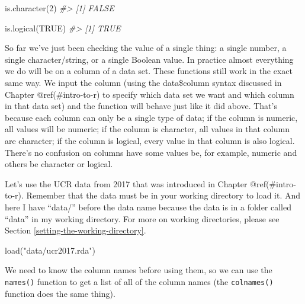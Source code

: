 \documentclass[
]{krantz}
\makeatletter
\newenvironment{Shaded}{\begin{snugshade}}{\end{snugshade}}
\newcommand{\CommentTok}[1]{\textcolor[rgb]{0.37,0.37,0.37}{\textit{#1}}}
\newcommand{\ConstantTok}[1]{\textcolor[rgb]{0,0,0}{#1}}
\newcommand{\DecValTok}[1]{\textcolor[rgb]{0.06,0.06,0.06}{#1}}
\newcommand{\FunctionTok}[1]{\textcolor[rgb]{0,0,0}{#1}}
\newcommand{\NormalTok}[1]{#1}
\newcommand{\StringTok}[1]{\textcolor[rgb]{0.5,0.5,0.5}{#1}}
\newenvironment{kframe}{%
\medskip{}
\setlength{\fboxsep}{.8em}
 \def\at@end@of@kframe{}%
 \ifinner\ifhmode%
  \def\at@end@of@kframe{\end{minipage}}%
  \begin{minipage}{\columnwidth}%
 \fi\fi%
 \def\FrameCommand##1{\hskip\@totalleftmargin \hskip-\fboxsep
 \colorbox{shadecolor}{##1}\hskip-\fboxsep
     \hskip-\linewidth \hskip-\@totalleftmargin \hskip\columnwidth}%
 \MakeFramed {\advance\hsize-\width
   \@totalleftmargin\z@ \linewidth\hsize
   \@setminipage}}%
 {\par\unskip\endMakeFramed%
 \at@end@of@kframe}
\renewenvironment{Shaded}{\begin{kframe}}{\end{kframe}}
\makeatother
\begin{document}
\begin{Shaded}
\begin{Highlighting}[]
\FunctionTok{is.character}\NormalTok{(}\DecValTok{2}\NormalTok{)}
\CommentTok{\#\textgreater{} [1] FALSE}
\end{Highlighting}
\end{Shaded}

\begin{Shaded}
\begin{Highlighting}[]
\FunctionTok{is.logical}\NormalTok{(}\ConstantTok{TRUE}\NormalTok{)}
\CommentTok{\#\textgreater{} [1] TRUE}
\end{Highlighting}
\end{Shaded}

So far we've just been checking the value of a single thing: a single number, a single character/string, or a single Boolean value. In practice almost everything we do will be on a column of a data set. These functions still work in the exact same way. We input the column (using the data\$column syntax discussed in Chapter @ref(\#intro-to-r) to specify which data set we want and which column in that data set) and the function will behave just like it did above. That's because each column can only be a single type of data; if the column is numeric, all values will be numeric; if the column is character, all values in that column are character; if the column is logical, every value in that column is also logical. There's no confusion on columns have some values be, for example, numeric and others be character or logical.

Let's use the UCR data from 2017 that was introduced in Chapter @ref(\#intro-to-r). Remember that the data must be in your working directory to load it. And here I have ``data/'' before the data name because the data is in a folder called ``data'' in my working directory. For more on working directories, please see Section \ref{setting-the-working-directory}.

\begin{Shaded}
\begin{Highlighting}[]
\FunctionTok{load}\NormalTok{(}\StringTok{"data/ucr2017.rda"}\NormalTok{)}
\end{Highlighting}
\end{Shaded}

We need to know the column names before using them, so we can use the \texttt{names()} function to get a list of all of the column names (the \texttt{colnames()} function does the same thing).
\end{document}

